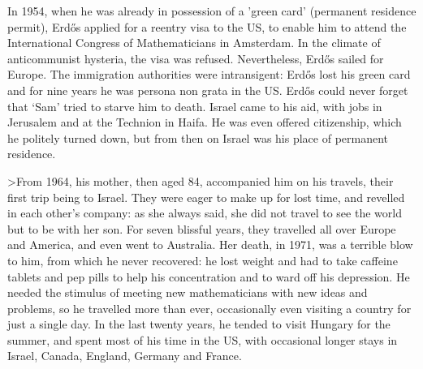 \documentclass[a6paper]{article}
\begin{document}
In 1954, when he was already in possession of a 'green card' (permanent 
residence permit), Erd\H{o}s applied for a reentry visa to the US, to enable
him to attend the International Congress of Mathematicians in Amsterdam. In 
the climate of anticommunist hysteria, the visa was refused. Nevertheless,
Erd\H{o}s sailed for Europe. The immigration authorities were intransigent:
Erd\H{o}s lost his green card and for nine years he was persona non grata 
in the US. Erd\H{o}s could never forget that `Sam' tried to starve him to 
death. Israel came to his aid, with jobs in 
Jerusalem and at the Technion in Haifa. He was even offered citizenship,
which he politely turned down, but from then on Israel was his place of 
permanent residence.

>From 1964, his mother, then aged 84, accompanied him on his travels, their
first trip being to Israel. They were eager to make up for lost time, and
revelled in each other's company: as she always said, she did not travel
to see the world but to be with her son. For seven blissful years, they 
travelled all over Europe and America, and even went to Australia. Her 
death, in 1971, was a terrible blow to him, from which he never recovered:
he lost weight and had to take caffeine tablets and pep pills to help his
concentration and to ward off his depression. He needed the stimulus of 
meeting new mathematicians with new ideas and problems, so he travelled more
than ever, occasionally even visiting a country for just a single day.
In the last twenty years, he tended to visit Hungary for the summer, and
spent most of his time in the US, with occasional longer stays in 
Israel, Canada, England, Germany and France.
\end{document}
